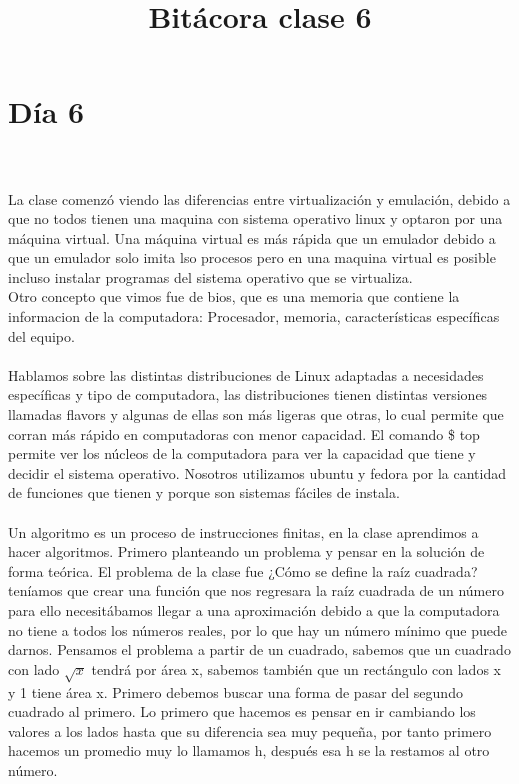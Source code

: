 \documentclass{book}
\begin{document}
	\section{Día 6}
	\title{\Huge Bitácora clase 6} \\
	\\
	La clase comenzó viendo las diferencias entre virtualización y emulación, debido a que no todos tienen una maquina con sistema operativo linux y optaron por una máquina virtual. Una máquina virtual es más rápida que un emulador debido a que un emulador solo imita lso procesos pero en una maquina virtual es posible incluso instalar programas del sistema operativo que se virtualiza.\\
	Otro concepto que vimos fue de bios, que es una memoria que contiene la informacion de la computadora: Procesador, memoria, características específicas del equipo.\\
	\\
	Hablamos sobre las distintas distribuciones de Linux adaptadas a necesidades específicas y tipo de computadora, las distribuciones tienen distintas versiones llamadas flavors y algunas de ellas son más ligeras que otras, lo cual permite que corran más rápido en computadoras con menor capacidad. El comando \$ top permite ver los núcleos de la computadora para ver la capacidad que tiene y decidir el sistema operativo. Nosotros utilizamos ubuntu y fedora por la cantidad de funciones que tienen y porque son sistemas fáciles de instala.\\
	\\
	Un algoritmo es un proceso de instrucciones finitas, en la clase aprendimos a hacer algoritmos. Primero planteando un problema y pensar en la solución de forma teórica. El problema de la clase fue ¿Cómo se define la raíz cuadrada? teníamos que crear una función que nos regresara la raíz cuadrada de un número para ello necesitábamos llegar a una aproximación debido a que la computadora no tiene a todos los números reales, por lo que hay un número mínimo que puede darnos.
	Pensamos el problema a partir de un cuadrado, sabemos que un cuadrado con lado $\sqrt{x}$ tendrá por área x, sabemos también que un rectángulo con lados x y 1 tiene área x. Primero debemos buscar una forma de pasar del segundo cuadrado al primero.
	Lo primero que hacemos es pensar en ir cambiando los valores a los lados hasta que su diferencia sea muy pequeña, por tanto primero hacemos un promedio muy lo llamamos h, después esa h se la restamos al otro número.\\
	\\
\end{document}
